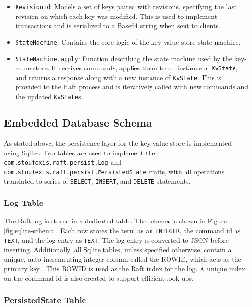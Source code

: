 \begin{itemize}
    \item \lstinline|RevisionId|: Models a set of keys paired with revisions, specifying the last revision on which each key was modified. This is used to implement transactions and is serialized to a Base64 string when sent to clients.
    \item \lstinline|StateMachine|: Contains the core logic of the key-value store state machine.
    \item \lstinline|StateMachine.apply|: Function describing the state machine used by the key-value store. It receives commands, applies them to an instance of \lstinline|KvState|, and returns a response along with a new instance of \lstinline|KvState|. This is provided to the Raft process and is iteratively called with new commands and the updated \lstinline|KvState|s.
\end{itemize}

\subsection{Embedded Database Schema} \label{sqlite-schema}

As stated above, the persistence layer for the key-value store is implemented using Sqlite. Two tables are used to implement the \lstinline|com.stoufexis.raft.persist.Log| and \lstinline|com.stoufexis.raft.persist.PersistedState| traits, with all operations translated to series of \lstinline|SELECT|, \lstinline|INSERT|, and \lstinline|DELETE| statements.

\subsubsection{Log Table}

The Raft log is stored in a dedicated table. The schema is shown in Figure \ref{fig:sqlite-schema}. Each row stores the term as an \lstinline|INTEGER|, the command id as \lstinline|TEXT|, and the log entry as \lstinline|TEXT|. The log entry is converted to JSON before inserting. Additionally, all Sqlite tables, unless specified otherwise, contain a unique, auto-incrementing integer column called the ROWID, which acts as the primary key \cite{sqlite-rowid}. This ROWID is used as the Raft index for the log. A unique index on the command id is also created to support efficient look-ups.\\

\subsubsection{PersistedState Table}

